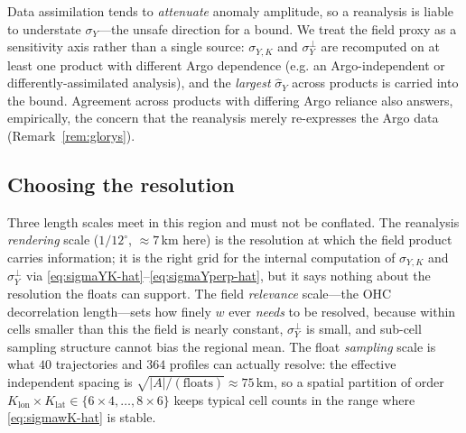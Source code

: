 \begin{remark}
\label{rem:conservative-Y}
Data assimilation tends to \emph{attenuate} anomaly amplitude, so a
reanalysis is liable to understate $\sigma_Y$---the unsafe direction for
a bound. We treat the field proxy as a sensitivity axis rather than a
single source: $\sigma_{Y,K}$ and $\sigma_Y^{\perp}$ are recomputed on
at least one product with different Argo dependence (e.g. an
Argo-independent or differently-assimilated analysis), and the
\emph{largest} $\hat\sigma_Y$ across products is carried into the bound.
Agreement across products with differing Argo reliance also answers,
empirically, the concern that the reanalysis merely re-expresses the
Argo data (Remark~\ref{rem:glorys}).
\end{remark}

\subsection{Choosing the resolution}
\label{sec:resolution}

Three length scales meet in this region and must not be conflated. The
reanalysis \emph{rendering} scale ($1/12^\circ$, ${\approx}7$\,km here)
is the resolution at which the field product carries information; it is
the right grid for the internal computation of $\sigma_{Y,K}$ and
$\sigma_Y^{\perp}$ via \eqref{eq:sigmaYK-hat}--\eqref{eq:sigmaYperp-hat},
but it says nothing about the resolution the floats can support. The
field \emph{relevance} scale---the OHC decorrelation length---sets how
finely $w$ ever \emph{needs} to be resolved, because within cells
smaller than this the field is nearly constant, $\sigma_Y^{\perp}$ is
small, and sub-cell sampling structure cannot bias the regional mean.
The float \emph{sampling} scale is what $40$ trajectories and $364$
profiles can actually resolve: the effective independent spacing is
$\sqrt{|A|/(\text{floats})}\approx75$\,km, so a spatial partition of
order $K_{\mathrm{lon}}\times K_{\mathrm{lat}}\in\{6\times4,\dots,8\times6\}$
keeps typical cell counts in the range where \eqref{eq:sigmawK-hat} is
stable.

